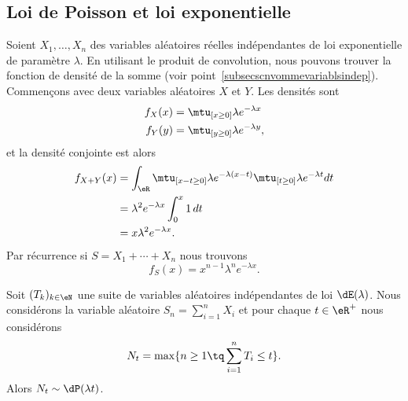 \subsection{Loi de Poisson et loi exponentielle}
\label{subsecPoissonetexpo}

Soient \( X_1,\ldots,X_n\) des variables aléatoires réelles indépendantes de loi exponentielle de paramètre \( \lambda\). En utilisant le produit de convolution, nous pouvons trouver la fonction de densité de la somme (voir point~\ref{subsecscnvommevariablsindep}). Commençons avec deux variables aléatoires \( X\) et \( Y\). Les densités sont
\begin{subequations}
	\begin{align}
		f_X(x) & =\mtu_{[x\geq 0]}\lambda e^{-\lambda x}  \\
		f_Y(y) & =\mtu_{[y\geq 0]}\lambda e^{-\lambda y},
	\end{align}
\end{subequations}
et la densité conjointe est alors
\begin{subequations}
	\begin{align}
		f_{X+Y}(x) & =\int_{\eR}\mtu_{[x-t\geq 0]}\lambda e^{-\lambda(x-t)}\mtu_{[t\geq 0]}\lambda e^{-\lambda t}dt \\
		           & =\lambda^2 e^{-\lambda x}\int_0^x1\,dt                                                         \\
		           & =x\lambda^2 e^{-\lambda x}.
	\end{align}
\end{subequations}
Par récurrence si \( S=X_1+\cdots+X_n\) nous trouvons
\begin{equation}
	f_S(x)=x^{n-1}\lambda^n e^{-\lambda x}.
\end{equation}

\begin{proposition}      \label{PropGMntiy}
	Soit \( (T_k)_{k\in\eN}\) une suite de variables aléatoires indépendantes de loi \( \dE(\lambda)\). Nous considérons la variable aléatoire \( S_n=\sum_{i=1}^nX_i\) et pour chaque \( t\in\eR^+\) nous considérons
	\begin{equation}
		N_t=\max\{ n\geq 1\tq \sum_{i=1}^nT_i\leq t \}.
	\end{equation}
	Alors \( N_t\sim\dP(\lambda t)\).

\end{proposition}

